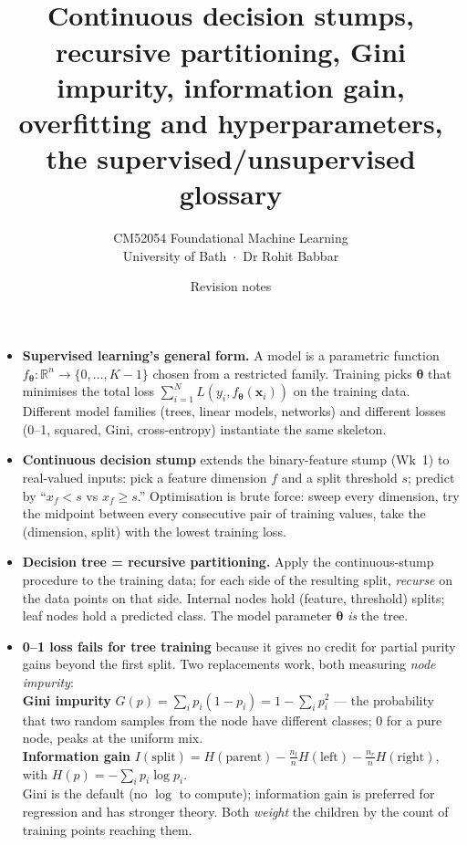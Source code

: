 \documentclass[11pt, a4paper]{article}
\title{\vspace{-1cm}{\Huge\bfseries Week 2 — Decision Trees} \\[0.4em]{\large Continuous decision stumps, recursive partitioning, Gini impurity, information gain, overfitting and hyperparameters, the supervised/unsupervised glossary}}
\author{\large CM52054 Foundational Machine Learning \\[0.2em]\normalsize University of Bath \,$\cdot$\, Dr Rohit Babbar}
\date{Revision notes}
\begin{document}
\maketitle
\thispagestyle{empty}

\vspace{1em}

\begin{tldrbox}
\begin{itemize}[leftmargin=*]
  \item \textbf{Supervised learning's general form.} A model is a parametric function $f_{\boldsymbol\theta}: \mathbb{R}^n \to \{0,\ldots,K-1\}$ chosen from a restricted family. Training picks $\boldsymbol\theta$ that minimises the total loss $\sum_{i=1}^N L(y_i, f_{\boldsymbol\theta}(\mathbf{x}_i))$ on the training data. Different model families (trees, linear models, networks) and different losses (0--1, squared, Gini, cross-entropy) instantiate the same skeleton.
  \item \textbf{Continuous decision stump} extends the binary-feature stump (Wk~1) to real-valued inputs: pick a feature dimension $f$ and a split threshold $s$; predict by ``$x_f < s$ vs $x_f \ge s$.'' Optimisation is brute force: sweep every dimension, try the midpoint between every consecutive pair of training values, take the (dimension, split) with the lowest training loss.
  \item \textbf{Decision tree = recursive partitioning.} Apply the continuous-stump procedure to the training data; for each side of the resulting split, \emph{recurse} on the data points on that side. Internal nodes hold (feature, threshold) splits; leaf nodes hold a predicted class. The model parameter $\boldsymbol\theta$ \emph{is} the tree.
  \item \textbf{0--1 loss fails for tree training} because it gives no credit for partial purity gains beyond the first split. Two replacements work, both measuring \emph{node impurity}: \\
        \quad \textbf{Gini impurity} $G(p) = \sum_i p_i(1 - p_i) = 1 - \sum_i p_i^2$ — the probability that two random samples from the node have different classes; $0$ for a pure node, peaks at the uniform mix. \\
        \quad \textbf{Information gain} $I(\text{split}) = H(\text{parent}) - \frac{n_l}{n} H(\text{left}) - \frac{n_r}{n} H(\text{right})$, with $H(p) = -\sum_i p_i \log p_i$. \\
        Gini is the default (no $\log$ to compute); information gain is preferred for regression and has stronger theory. Both \emph{weight} the children by the count of training points reaching them.

\end{itemize}
\end{tldrbox}
\end{document}
